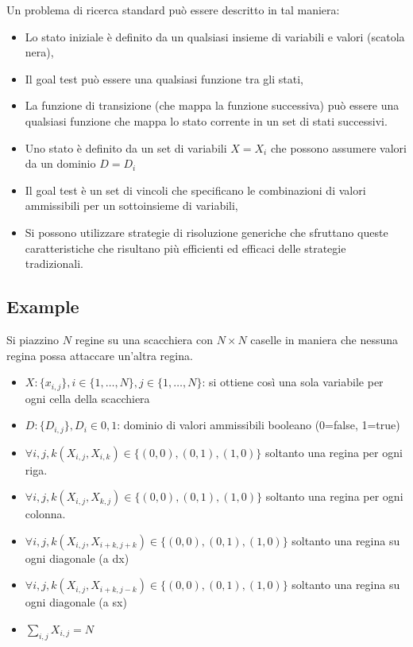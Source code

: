 \documentclass[12pt, a4paper]{article}
\begin{document}
Un problema di ricerca standard può essere descritto in tal maniera:

\begin{itemize}
  \item Lo stato iniziale è definito da un qualsiasi insieme di variabili e valori (scatola nera),
  \item Il goal test può essere una qualsiasi funzione tra gli stati,
  \item La funzione di transizione (che mappa la funzione successiva) può essere una qualsiasi funzione che mappa lo stato corrente in un set di stati successivi.
\end{itemize}

\begin{itemize}
  \item Uno stato è definito da un set di variabili $X=X_i$ che possono assumere valori da un dominio $D=D_i$
  \item Il goal test è un set di vincoli che specificano le combinazioni di valori ammissibili per un sottoinsieme di variabili,
  \item Si possono utilizzare strategie di risoluzione generiche che sfruttano queste caratteristiche che risultano più efficienti ed efficaci delle strategie tradizionali.
\end{itemize}

\subsection*{Example}

Si piazzino $N$ regine su una scacchiera con $N\times N$ caselle in maniera che nessuna regina possa attaccare un'altra regina.

\begin{itemize}
  \item $X:\{x_{i,j}\},i\in\{1,\dots,N\},j\in\{1,\dots,N\}$: si ottiene così una sola variabile per ogni cella della scacchiera
  \item $D:\{D_{i,j}\},D_i\in0,1$: dominio di valori ammissibili booleano (0=false, 1=true)
  \item $\forall{i,j,k}(X_{i,j},X_{i,k})\in\{(0,0),(0,1),(1,0)\}$ soltanto una regina per ogni riga.
  \item $\forall{i,j,k}(X_{i,j},X_{k,j})\in\{(0,0),(0,1),(1,0)\}$ soltanto una regina per ogni colonna.
  \item $\forall{i,j,k}(X_{i,j},X_{i+k,j+k})\in\{(0,0),(0,1),(1,0)\}$ soltanto una regina su ogni diagonale (a dx)
  \item $\forall{i,j,k}(X_{i,j},X_{i+k,j-k})\in\{(0,0),(0,1),(1,0)\}$ soltanto una regina su ogni diagonale (a sx)
  \item $\sum_{i,j}X_{i,j} = N$
\end{itemize}
\end{document}

